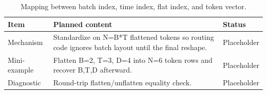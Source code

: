 \begin{table}[H]
\centering
\caption{Mapping between batch index, time index, flat index, and token vector.}
\label{tab:ch06-flattened-tokens-as-the-dispatch-unit}
\begin{tabularx}{\textwidth}{p{}X p{}}
\toprule
Item & Planned content & Status \\
\midrule
Mechanism & Standardize on N=B*T flattened tokens so routing code ignores batch layout until the final reshape. & Placeholder \\
Mini-example & Flatten B=2, T=3, D=4 into N=6 token rows and recover B,T,D afterward. & Placeholder \\
Diagnostic & Round-trip flatten/unflatten equality check. & Placeholder \\
\bottomrule
\end{tabularx}
\end{table}
